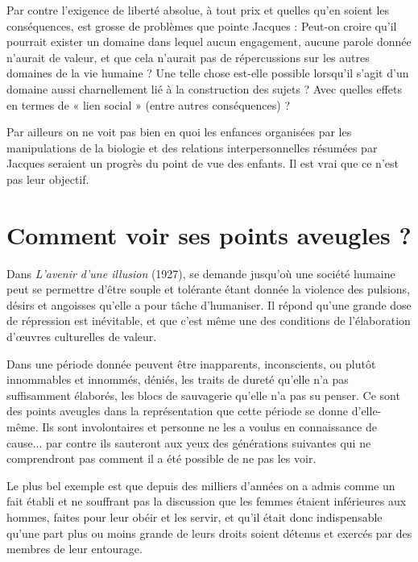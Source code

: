  Par contre l'exigence de liberté absolue, à tout prix et quelles qu'en soient les conséquences, est grosse de problèmes que pointe Jacques  :  Peut-on croire qu'il pourrait exister un domaine  dans lequel aucun engagement, aucune parole donnée n'aurait de valeur, et que cela n'aurait pas de répercussions sur les autres domaines de la vie humaine ? Une telle chose est-elle possible lorsqu'il s'agit d'un domaine aussi charnellement lié à la construction des sujets ? Avec quelles effets en termes de « lien social » (entre autres conséquences) ?
 
 Par ailleurs on ne voit pas bien en quoi les enfances organisées par les manipulations de la biologie et des relations interpersonnelles résumées par Jacques  seraient un progrès du point de vue des enfants. Il est vrai que ce n'est pas leur objectif.
 
 
 \section{Comment voir ses points aveugles ?} 
 
 Dans \emph{L'avenir d'une illusion} (1927),  se demande jusqu'où une société humaine peut se permettre d'être souple et tolérante étant donnée la violence des pulsions, désirs et angoisses qu'elle a pour tâche d'humaniser. Il répond qu'une grande dose de répression est inévitable, et que c'est même une des conditions de l'élaboration d'œuvres culturelles de valeur.

 Dans une période donnée peuvent être inapparents, inconscients, ou plutôt innommables et innommés, déniés, les traits de dureté qu'elle n'a pas suffisamment élaborés, les blocs de sauvagerie qu'elle n'a pas su penser. Ce sont des points aveugles dans la représentation que cette période se donne d'elle-même. Ils sont involontaires et personne ne les a voulus en connaissance de cause... par contre ils sauteront aux yeux des générations suivantes qui ne comprendront pas comment il a été possible de ne pas les voir. 
 
 Le plus bel exemple est que depuis des milliers d'années on a admis comme un fait établi et ne souffrant pas la discussion que les femmes étaient inférieures aux hommes, faites pour leur obéir et les servir, et qu'il était donc indispensable qu'une part plus ou moins grande de leurs droits soient détenus et exercés par des membres de leur entourage. 

